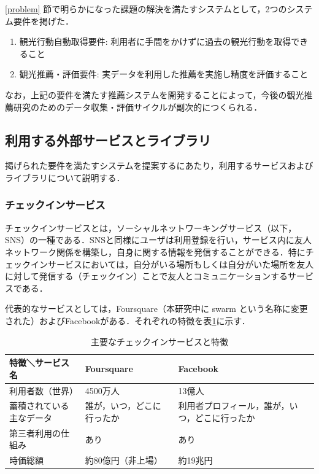 \documentclass{jsarticle}
\begin{document}
\ref{problem} 節で明らかになった課題の解決を満たすシステムとして，2つのシステム要件を掲げた．

\begin{enumerate}
\item 観光行動自動取得要件: 利用者に手間をかけずに過去の観光行動を取得できること
\item 観光推薦・評価要件: 実データを利用した推薦を実施し精度を評価すること
\end{enumerate}

なお，上記の要件を満たす推薦システムを開発することによって，今後の観光推薦研究のためのデータ収集・評価サイクルが副次的につくられる．

\subsection{利用する外部サービスとライブラリ}

掲げられた要件を満たすシステムを提案するにあたり，利用するサービスおよびライブラリについて説明する．

\subsubsection{チェックインサービス}

チェックインサービスとは，ソーシャルネットワーキングサービス（以下，SNS）の一種である．SNSと同様にユーザは利用登録を行い，サービス内に友人ネットワーク関係を構築し，自身に関する情報を発信することができる．特にチェックインサービスにおいては，自分がいる場所もしくは自分がいた場所を友人に対して発信する（チェックイン）ことで友人とコミュニケーションするサービスである．

代表的なサービスとしては，Foursquare（本研究中に swarm という名称に変更された）およびFacebookがある．それぞれの特徴を表\ref{features_of_checkin_service}に示す．

\begin{table}[!h]
\small
\caption{主要なチェックインサービスと特徴}
\begin{center}
\begin{tabular}{lll}
\label{features_of_checkin_service}
特徴＼サービス名            & Foursquare                    & Facebook \\ \hline
利用者数（世界）            & 4500万人                      & 13億人 \\
蓄積されている主なデータ    & 誰が，いつ，どこに行ったか    & 利用者プロフィール，誰が，いつ，どこに行ったか \\
第三者利用の仕組み          & あり                          & あり \\
時価総額                    & 約80億円（非上場）            & 約19兆円 \\
\end{tabular}
\end{center}
\end{table}
\end{document}
